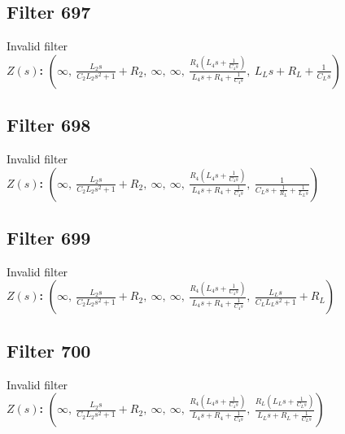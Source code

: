 \documentclass{article}
\begin{document}
\subsection*{Filter 697}
Invalid filter \\ 
\textbf{$Z(s)$:} $\left( \infty, \  \frac{L_{2} s}{C_{2} L_{2} s^{2} + 1} + R_{2}, \  \infty, \  \infty, \  \frac{R_{4} \left(L_{4} s + \frac{1}{C_{4} s}\right)}{L_{4} s + R_{4} + \frac{1}{C_{4} s}}, \  L_{L} s + R_{L} + \frac{1}{C_{L} s}\right)$ \\ 
\subsection*{Filter 698}
Invalid filter \\ 
\textbf{$Z(s)$:} $\left( \infty, \  \frac{L_{2} s}{C_{2} L_{2} s^{2} + 1} + R_{2}, \  \infty, \  \infty, \  \frac{R_{4} \left(L_{4} s + \frac{1}{C_{4} s}\right)}{L_{4} s + R_{4} + \frac{1}{C_{4} s}}, \  \frac{1}{C_{L} s + \frac{1}{R_{L}} + \frac{1}{L_{L} s}}\right)$ \\ 
\subsection*{Filter 699}
Invalid filter \\ 
\textbf{$Z(s)$:} $\left( \infty, \  \frac{L_{2} s}{C_{2} L_{2} s^{2} + 1} + R_{2}, \  \infty, \  \infty, \  \frac{R_{4} \left(L_{4} s + \frac{1}{C_{4} s}\right)}{L_{4} s + R_{4} + \frac{1}{C_{4} s}}, \  \frac{L_{L} s}{C_{L} L_{L} s^{2} + 1} + R_{L}\right)$ \\ 
\subsection*{Filter 700}
Invalid filter \\ 
\textbf{$Z(s)$:} $\left( \infty, \  \frac{L_{2} s}{C_{2} L_{2} s^{2} + 1} + R_{2}, \  \infty, \  \infty, \  \frac{R_{4} \left(L_{4} s + \frac{1}{C_{4} s}\right)}{L_{4} s + R_{4} + \frac{1}{C_{4} s}}, \  \frac{R_{L} \left(L_{L} s + \frac{1}{C_{L} s}\right)}{L_{L} s + R_{L} + \frac{1}{C_{L} s}}\right)$ \\ 
\end{document}
